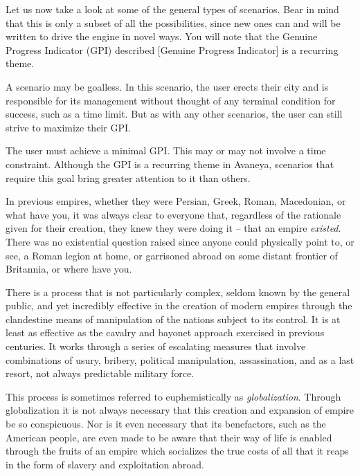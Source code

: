Let us now take a look at some of the general types of scenarios. Bear in mind that this is only a subset of all the possibilities, since new ones can and will be written to drive the engine in novel ways. You will note that the Genuine Progress Indicator (GPI) described [Genuine Progress Indicator] is a recurring theme.


A scenario may be goalless. In this scenario, the user erects their city and is responsible for its management without thought of any terminal condition for success, such as a time limit. But as with any other scenarios, the user can still strive to maximize their GPI.


The user must achieve a minimal GPI. This may or may not involve a time constraint. Although the GPI is a recurring theme in Avaneya, scenarios that require this goal bring greater attention to it than others.




In previous empires, whether they were Persian, Greek, Roman, Macedonian, or what have you, it was always clear to everyone that, regardless of the rationale given for their creation, they knew they were doing it -- that an empire {\it existed}. There was no existential question raised since anyone could physically point to, or see, a Roman legion at home, or garrisoned abroad on some distant frontier of Britannia, or where have you.

There is a process that is not particularly complex, seldom known by the general public, and yet incredibly effective in the creation of modern empires through the clandestine means of manipulation of the nations subject to its control. It is at least as effective as the cavalry and bayonet approach exercised in previous centuries. It works through a series of escalating measures that involve combinations of usury, bribery, political manipulation, assassination, and as a last resort, not always predictable military force. 

This process is sometimes referred to euphemistically as {\it globalization}. Through globalization it is not always necessary that this creation and expansion of empire be so conspicuous. Nor is it even necessary that its benefactors, such as the American people, are even made to be aware that their way of life is enabled through the fruits of an empire which socializes the true costs of all that it reaps in the form of slavery and exploitation abroad.

